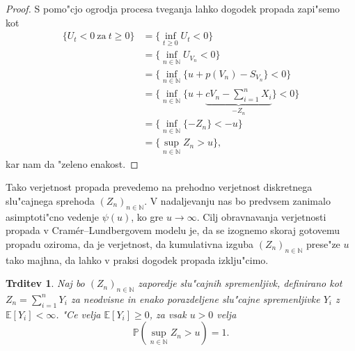 \documentclass[12pt, a4paper, reqno]{amsart}
\theoremstyle{definition}
\theoremstyle{plain}
\newtheorem{trditev}[definicija]{Trditev}
\newcommand{\N}{\mathbb{N}}
\newcommand{\E}{\mathbb{E}}
\newcommand{\Prob}{\mathbb{P}}
\newcommand{\1}{\mathds{1}}
\begin{document}
        \begin{proof}

            S pomo"cjo ogrodja procesa tveganja lahko dogodek propada zapi"semo kot
            \begin{align*}
                \bigl\{U_t<0 \ \text{za} \ t\geq 0\bigr\} &= 
                                \biggl\{\inf_{t\geq0}U_t<0\biggr\} \\
                              &= \biggl\{\inf_{n\in\N}U_{V_n}<0\biggr\} \\
                              &= \biggl\{\inf_{n\in\N}\bigl\{u + p(V_n) - S_{V_n}\bigr\} < 0\biggr\} \\
                              &= \biggl\{\inf_{n\in\N}\biggl\{u + 
                              \underbrace{cV_n - \sum_{i=1}^nX_i}_{-Z_n}\biggr\} < 0\biggr\} \\
                              &= \biggl\{\inf_{n\in\N}\{-Z_n\} < -u\biggr\} \\
                              &= \biggl\{\sup_{n\in\N}Z_n > u\biggr\},
            \end{align*}
            kar nam da "zeleno enakost.
        \end{proof}

        Tako verjetnost propada prevedemo na prehodno verjetnost diskretnega slu"cajnega 
        sprehoda $(Z_n)_{n\in\N}$. V nadaljevanju nas bo predvsem zanimalo asimptoti"cno 
        vedenje $\psi(u)$, ko gre $u\rightarrow\infty$. Cilj obravnavanja verjetnosti propada v 
        Cramér--Lundbergovem modelu je, da se izognemo skoraj gotovemu propadu oziroma, da je verjetnost, 
        da kumulativna izguba $(Z_n)_{n\in\N}$ prese"ze $u$
        tako majhna, da lahko v praksi dogodek propada izklju"cimo. 

        \begin{trditev}
            Naj bo $(Z_n)_{n\in\N}$ zaporedje slu"cajnih spremenljivk, definirano kot 
            $Z_n = \sum_{i=1}^nY_i$ za neodvisne in enako porazdeljene slu"cajne spremenljivke 
            $Y_i$ z $\E\left[Y_i\right] < \infty$. 
            "Ce velja $\E\left[Y_i\right] \geq 0$, za vsak $u>0$ velja
            \begin{equation*}
                \Prob\left(\sup_{n\in\N}Z_n > u\right) = 1.
            \end{equation*}
            \label{trd:propadZVerjetnostjo1}
        \end{trditev}
\end{document}
